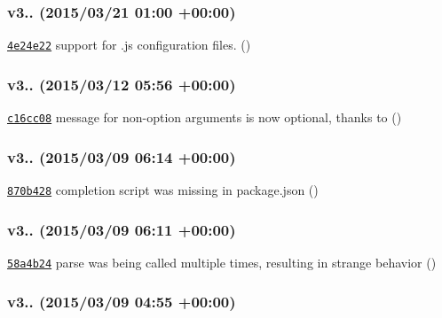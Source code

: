 \subsubsection*{v3.. (2015/03/21 01\+:00 +00\+:00)}


\begin{DoxyItemize}
\item \href{https://github.com/bcoe/yargs/commit/4e24e22e6a195e55ab943ede704a0231ac33b99c}{\tt 4e24e22} support for .js configuration files. ()
\end{DoxyItemize}

\subsubsection*{v3.. (2015/03/12 05\+:56 +00\+:00)}


\begin{DoxyItemize}
\item \href{https://github.com/bcoe/yargs/commit/c16cc085501155cf7fd853ccdf8584b05ab92b78}{\tt c16cc08} message for non-\/option arguments is now optional, thanks to ()
\end{DoxyItemize}

\subsubsection*{v3.. (2015/03/09 06\+:14 +00\+:00)}


\begin{DoxyItemize}
\item \href{https://github.com/bcoe/yargs/commit/870b428cf515d560926ca392555b7ad57dba9e3d}{\tt 870b428} completion script was missing in package.\+json ()
\end{DoxyItemize}

\subsubsection*{v3.. (2015/03/09 06\+:11 +00\+:00)}


\begin{DoxyItemize}
\item \href{https://github.com/bcoe/yargs/commit/58a4b2473ebbb326713d522be53e32d3aabb08d2}{\tt 58a4b24} parse was being called multiple times, resulting in strange behavior ()
\end{DoxyItemize}

\subsubsection*{v3.. (2015/03/09 04\+:55 +00\+:00)}


